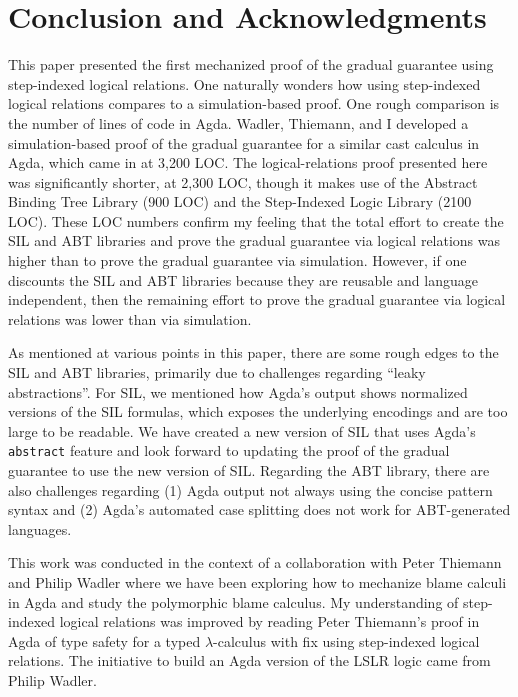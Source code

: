 \documentclass[submission,copyright,creativecommons]{eptcs}
\begin{document}
\section{Conclusion and Acknowledgments}
\label{sec:conclusion}

This paper presented the first mechanized proof of the gradual
guarantee using step-indexed logical relations. One naturally wonders
how using step-indexed logical relations compares to a
simulation-based proof. One rough comparison is the number of lines of
code in Agda. Wadler, Thiemann, and I developed a simulation-based
proof of the gradual guarantee for a similar cast calculus in Agda,
which came in at 3,200 LOC. The logical-relations proof presented here
was significantly shorter, at 2,300 LOC, though it makes use of the
Abstract Binding Tree Library (900 LOC) and the Step-Indexed Logic
Library (2100 LOC). These LOC numbers confirm my feeling that the
total effort to create the SIL and ABT libraries and prove the gradual
guarantee via logical relations was higher than to prove the gradual
guarantee via simulation. However, if one discounts the SIL and ABT
libraries because they are reusable and language independent, then the
remaining effort to prove the gradual guarantee via logical relations
was lower than via simulation.

As mentioned at various points in this paper, there are some rough
edges to the SIL and ABT libraries, primarily due to challenges
regarding ``leaky abstractions''. For SIL, we mentioned how Agda's
output shows normalized versions of the SIL formulas, which exposes
the underlying encodings and are too large to be readable. We have
created a new version of SIL that uses Agda's \texttt{abstract}
feature and look forward to updating the proof of the gradual
guarantee to use the new version of SIL. Regarding the ABT library,
there are also challenges regarding (1) Agda output not always using
the concise pattern syntax and (2) Agda's automated case splitting
does not work for ABT-generated languages.

This work was conducted in the context of a collaboration with Peter
Thiemann and Philip Wadler where we have been exploring how to
mechanize blame calculi in Agda and study the polymorphic blame
calculus. My understanding of step-indexed logical relations was
improved by reading Peter Thiemann's proof in Agda of type safety for
a typed $\lambda$-calculus with \textsf{fix} using step-indexed
logical relations. The initiative to build an Agda version of the LSLR
logic came from Philip Wadler.




\end{document}
